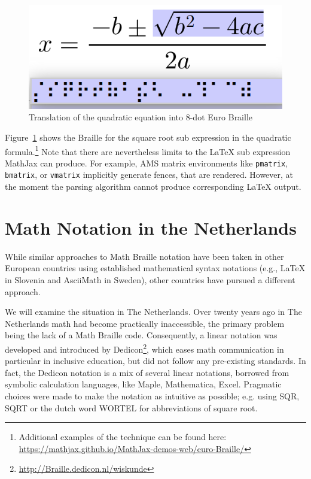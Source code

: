 \documentclass{easychair}
\begin{document}
\begin{figure}
  \includegraphics[width=.6\textwidth]{quadratic-square.png}
  \caption{Translation of the quadratic equation into 8-dot Euro Braille}
  \label{fig:subBraille}
\end{figure}

Figure~\ref{fig:subBraille} shows the Braille for the square root sub expression
in the quadratic formula.\footnote{Additional examples of the technique can be found
here: \url{https://mathjax.github.io/MathJax-demos-web/euro-Braille/}} Note that
there are nevertheless limits to the {\LaTeX} sub expression MathJax can
produce. For example, AMS matrix environments like \texttt{pmatrix},
\texttt{bmatrix}, or \texttt{vmatrix} implicitly generate fences, that are
rendered. However, at the moment the parsing algorithm cannot produce
corresponding {\LaTeX} output.

\section{Math Notation in the Netherlands}\label{sec:math-netherlands}

While similar approaches to Math Braille notation have been taken in other
European countries using established mathematical syntax notations (e.g.,
{\LaTeX} in Slovenia and AsciiMath in Sweden), other countries have pursued a
different approach.

We will examine the situation in The Netherlands. Over twenty years ago in The
Netherlands math had become practically inaccessible, the primary problem being
the lack of a Math Braille code. Consequently, a linear notation was developed
and introduced by Dedicon\footnote{\url{http://Braille.dedicon.nl/wiskunde}},
which eases math communication in particular in inclusive education, but did not
follow any pre-existing standards. In fact, the Dedicon notation is a mix of
several linear notations, borrowed from symbolic calculation languages, like
Maple, Mathematica, Excel. Pragmatic choices were made to make the notation as
intuitive as possible; e.g. using SQR, SQRT or the dutch word WORTEL for
abbreviations of square root.
\end{document}
